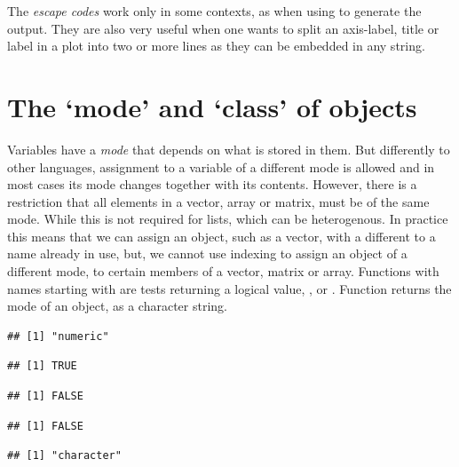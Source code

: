 \documentclass[krantz2]{krantz}\usepackage{knitr}%
\begin{document}
The \textit{escape codes} work only in some contexts, as when using  to generate the output. They are also very useful when one wants to split an axis-label, title or label in a plot into two or more lines as they can be embedded in any string.

\section{The `mode' and `class' of objects}\label{sec:rlang:mode}
Variables have a \emph{mode} that depends on what is stored in them. But differently to other languages, assignment to a variable of a different mode is allowed and in most cases its mode changes together with its contents. However, there is a restriction that all elements in a vector, array or matrix, must be of the same mode. While this is not required for lists, which can be heterogenous. In practice this means that we can assign an object, such as a vector, with a different  to a name already in use, but, we cannot use indexing to assign an object of a different mode, to certain members of a vector, matrix or array. Functions with names starting with  are tests returning a logical value, ,  or . Function  returns the mode of an object, as a character string.

\begin{knitrout}\footnotesize
{}\color{fgcolor}\begin{kframe}
\begin{alltt}
 \hlkwb{<-} \hlopt{:}
\end{alltt}
\begin{verbatim}
## [1] "numeric"
\end{verbatim}
\begin{alltt}
\end{alltt}
\begin{verbatim}
## [1] TRUE
\end{verbatim}
\begin{alltt}
\end{alltt}
\begin{verbatim}
## [1] FALSE
\end{verbatim}
\begin{alltt}
\end{alltt}
\begin{verbatim}
## [1] FALSE
\end{verbatim}
\begin{alltt}
 \hlkwb{<-} 
\end{alltt}
\begin{verbatim}
## [1] "character"
\end{verbatim}
\end{kframe}
\end{knitrout}
\end{document}
